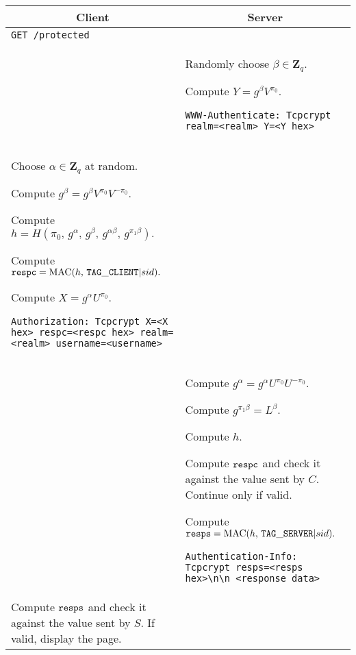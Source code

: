 \documentclass[12pt]{article}
\begin{document}
\begin{tabular}{p{9cm} | p{9cm}}
\multicolumn{1}{c}{\bf Client} & \multicolumn{1}{c}{\bf Server} \\
\hline
{\tt GET /protected} &\\

& Randomly choose $\beta \in \mathbf{Z}_q.$

Compute $Y=g^\beta V^{\pi_0}.$

{\tt WWW-Authenticate: Tcpcrypt realm=<realm> Y=<Y hex>} \\

Choose $\alpha \in \mathbf{Z}_q$ at random.

Compute $g^\beta = g^\beta V^{\pi_0} V^{-\pi_0}.$

Compute $h = H(\pi_0,\, g^\alpha,\, g^\beta,\, g^{\alpha \beta},\, g^{\pi_1 \beta}).$

Compute ${\tt respc} = \operatorname{MAC}(h,\, {\tt TAG\_CLIENT} | sid).$

Compute $X=g^\alpha U^{\pi_0}.$

{\tt Authorization: Tcpcrypt X=<X hex> respc=<respc hex> realm=<realm> username=<username>} & \\

& Compute $g^\alpha = g^\alpha U^{\pi_0} U^{-\pi_0}.$

Compute $g^{\pi_1 \beta} = L^\beta.$

Compute $h$.

Compute ${\tt respc}$ and check it against the value sent by $C.$ Continue only if valid.

Compute ${\tt resps} = \operatorname{MAC}(h,\, {\tt TAG\_SERVER} | sid).$

{\tt Authentication-Info: Tcpcrypt resps=<resps hex>\textbackslash n\textbackslash n <response data>} \\

Compute ${\tt resps}$ and check it against the value sent by $S.$ If valid, display the page.
\end{tabular}
\end{document}
